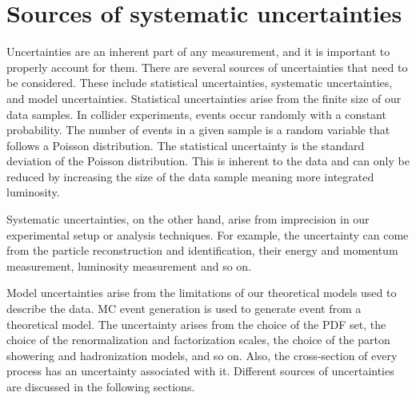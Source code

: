 \chapter{Sources of systematic uncertainties}
\label{sec:sources-of-uncertainties}
Uncertainties are an inherent part of any measurement, and it is important to properly account for them. There are several sources of uncertainties that need to be considered. These include statistical uncertainties, systematic uncertainties, and model uncertainties. Statistical uncertainties arise from the finite size of our data samples. In collider experiments, events occur randomly with a constant probability. The number of events in a given sample is a random variable that follows a Poisson distribution. The statistical uncertainty is the standard deviation of the Poisson distribution. This is inherent to the data and can only be reduced by increasing the size of the data sample meaning more integrated luminosity.

Systematic uncertainties, on the other hand, arise from imprecision in our experimental setup or analysis techniques. For example, the uncertainty can come from the particle reconstruction and identification, their energy and momentum measurement, luminosity measurement and so on.

Model uncertainties arise from the limitations of our theoretical models used to describe the data. MC event generation is used to generate event from a theoretical model. The uncertainty arises from the choice of the PDF set, the choice of the renormalization and factorization scales, the choice of the parton showering and hadronization models, and so on. Also, the cross-section of every process has an uncertainty associated with it. Different sources of uncertainties are discussed in the following sections. 

